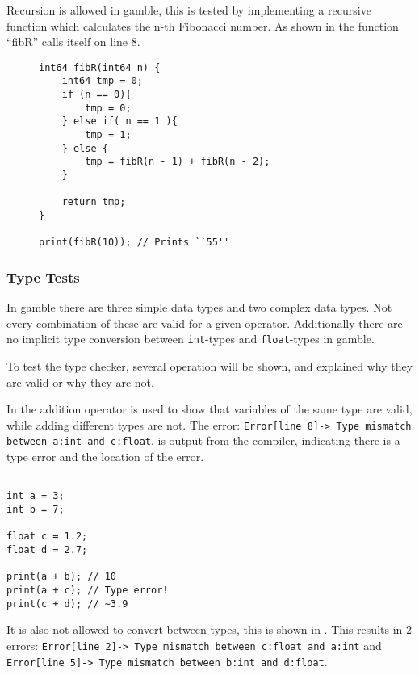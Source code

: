 Recursion is allowed in \gls{gamble}, this is tested by implementing a recursive function which calculates the n-th Fibonacci number.
As shown in  the function ``fibR'' calls itself on line 8.
\begin{figure}
\begin{lstlisting}[caption={Recursive Fibonacci in \gls{gamble}},label={lst:fibR},frame=tb]
int64 fibR(int64 n) {
    int64 tmp = 0;
    if (n == 0){
        tmp = 0;
    } else if( n == 1 ){
        tmp = 1;
    } else {
        tmp = fibR(n - 1) + fibR(n - 2);
    }

    return tmp;
}

print(fibR(10)); // Prints ``55''
\end{lstlisting}
\end{figure}

\subsubsection*{Type Tests}
In \gls{gamble} there are three simple data types and two complex data types.
Not every combination of these are valid for a given operator.
Additionally there are no implicit type conversion between \texttt{int}-types and \texttt{float}-types in \gls{gamble}.

To test the type checker, several operation will be shown, and explained why they are valid or why they are not.

In  the addition operator is used to show that variables of the same type are valid, while adding different types are not.
The error: \texttt{Error[line    8]-> Type mismatch between a:int and c:float}, is output from the compiler, indicating there is a type error and the location of the error.
\begin{lstlisting}[caption={Addition in \gls{gamble} to demonstrate the type checker.},label={lst:type1},frame=tb]

int a = 3;
int b = 7;

float c = 1.2;
float d = 2.7;

print(a + b); // 10
print(a + c); // Type error!
print(c + d); // ~3.9
\end{lstlisting}

It is also not allowed to convert between types, this is shown in .
This results in 2 errors: \texttt{Error[line    2]-> Type mismatch between c:float and a:int} and \texttt{Error[line    5]-> Type mismatch between b:int and d:float}.

